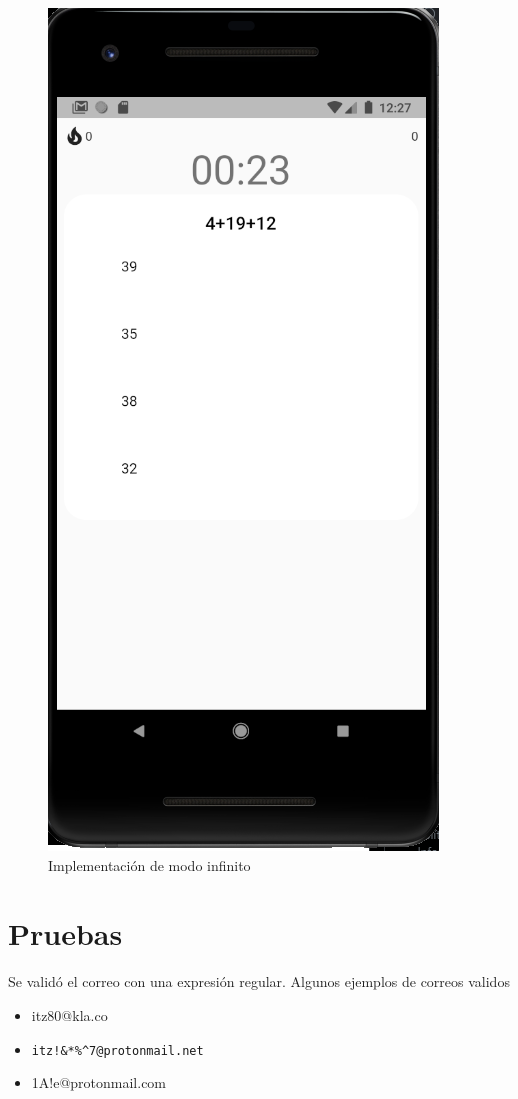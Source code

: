 \documentclass{article}
\begin{document}
\begin{figure}[H]
    \centering
    \includegraphics[scale=0.8]{imgs/Imp/Endless}
    \caption{Implementación de modo infinito}
\end{figure}
\section{Pruebas}%
Se validó el correo con una expresión regular. Algunos ejemplos de correos validos
\begin{itemize}
	\item itz80@kla.co
	\item \verb |itz!&*%
	\item 1A!e@protonmail.com
\end{itemize}

\pagebreak
\printbibliography
\end{document}
